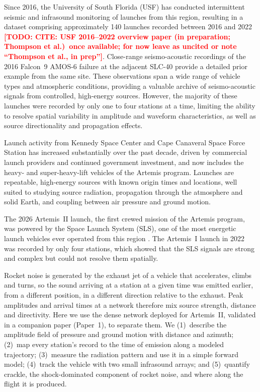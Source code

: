 \documentclass[]{seismica}
\newcommand{\todo}[1]{\textcolor{red}{\textbf{[TODO: #1]}}}
\newcommand{\paperone}{Paper~1}
\begin{document}
Since 2016, the University of South Florida (USF) has conducted
intermittent seismic and infrasound monitoring of launches from this
region, resulting in a dataset comprising approximately 140 launches
recorded between 2016 and 2022 \todo{CITE: USF 2016--2022 overview
paper (in preparation; Thompson et al.)\ once available; for now
leave as uncited or note ``Thompson et al., in prep''}. Close-range
seismo-acoustic recordings of the 2016 Falcon~9 AMOS-6 failure at the
adjacent SLC-40 \citep{thompson_amos6_2026} provide a detailed prior
example from the same site. These observations span a wide range of vehicle types and
atmospheric conditions, providing a valuable archive of seismo-acoustic
signals from controlled, high-energy sources. However, the majority of
these launches were recorded by only one to four stations at a time,
limiting the ability to resolve spatial variability in amplitude and
waveform characteristics, as well as source directionality and
propagation effects.

Launch activity from Kennedy Space Center and Cape Canaveral Space
Force Station has increased substantially over the past decade, driven
by commercial launch providers and continued government investment, and
now includes the heavy- and super-heavy-lift vehicles of the Artemis
program. Launches are repeatable, high-energy sources with known origin
times and locations, well suited to studying source radiation,
propagation through the atmosphere and solid Earth, and coupling between
air pressure and ground motion.

The 2026 Artemis~II launch, the first crewed mission of the Artemis
program, was powered by the Space Launch System (SLS), one of the most
energetic launch vehicles ever operated from this region
\citep{NASA_SLS,Sutton2017}. The Artemis~I launch in 2022 was recorded
by only four stations, which showed that the SLS signals are strong and
complex but could not resolve them spatially.

Rocket noise is generated by the exhaust jet of a vehicle that
accelerates, climbs and turns, so the sound arriving at a station at a
given time was emitted earlier, from a different position, in a
different direction relative to the exhaust. Peak amplitudes and arrival
times at a network therefore mix source strength, distance and
directivity. Here we use the dense network deployed for Artemis~II,
validated in a companion paper (\paperone), to separate them. We
(1)~describe the amplitude field of pressure and ground motion with
distance and azimuth; (2)~map every station's record to the time of
emission along a modeled trajectory; (3)~measure the radiation pattern
and use it in a simple forward model; (4)~track the vehicle with two
small infrasound arrays; and (5)~quantify crackle, the shock-dominated
component of rocket noise, and where along the flight it is produced.
\end{document}
